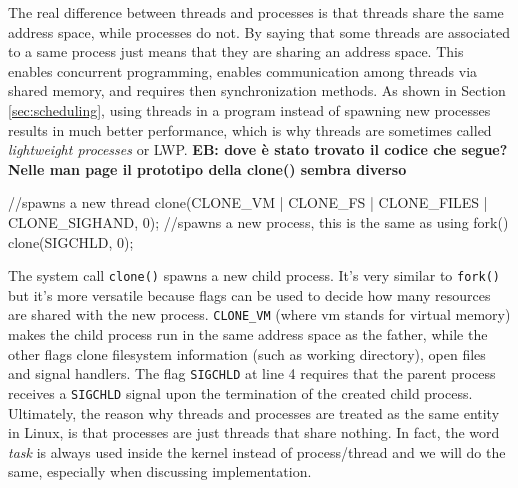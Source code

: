\documentclass[10pt, oneside]{book}
\newcommand{\mycomment}[1]{\textbf{#1}}  %
\begin{document}
The real difference between threads and processes is that threads share the same address space, while processes do not. By saying that some threads are associated to a same process just means that they are sharing an address space. This enables concurrent programming, enables communication among threads via shared memory, and requires then synchronization methods. As shown in Section \ref{sec:scheduling},
using threads in a program instead of spawning new processes results in much better performance, which is why threads are sometimes called \textit{lightweight processes} or LWP. %
\mycomment{EB: dove \`e stato trovato il codice che segue? Nelle man page il prototipo della clone() sembra diverso}
\begin{code}
//spawns a new thread
clone(CLONE_VM | CLONE_FS | CLONE_FILES | CLONE_SIGHAND, 0); 
//spawns a new process, this is the same as using fork()
clone(SIGCHLD, 0); 
\end{code}
The system call \verb|clone()| spawns a new child process. It's very
similar to \verb|fork()| but it's more versatile because flags can be
used to decide how many resources are shared with the new
process. \verb|CLONE_VM| (where vm stands for virtual memory) makes
the child process run in the same address space as the father, while
the other flags clone filesystem information (such as working
directory), open files and signal handlers. The flag \verb|SIGCHLD| at
line 4 requires that the parent process receives a \texttt{SIGCHLD}
signal upon the termination of the created child process.  Ultimately,
the reason why threads and processes are treated as the same entity in
Linux, is that processes are just threads that share nothing. In fact,
the word \textit{task} is always used inside the kernel instead of
process/thread and we will do the same, especially when discussing
implementation.
\end{document}

